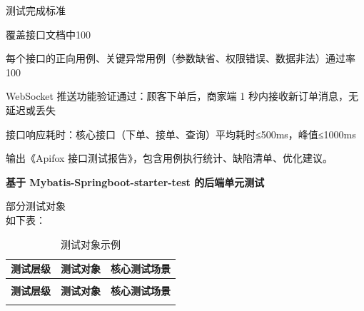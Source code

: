 \begin{levellist}
\begin{levellist}
\begin{levellist}
            \item 测试完成标准
            \begin{levellist}
                \item 覆盖接口文档中100%
                \item 每个接口的正向用例、关键异常用例（参数缺省、权限错误、数据非法）通过率100%
                \item WebSocket 推送功能验证通过：顾客下单后，商家端 1 秒内接收新订单消息，无延迟或丢失
                \item 接口响应耗时：核心接口（下单、接单、查询）平均耗时≤500ms，峰值≤1000ms
                \item 输出《Apifox 接口测试报告》，包含用例执行统计、缺陷清单、优化建议。
            \end{levellist}

        \end{levellist}

        \item \textbf{基于 Mybatis-Springboot-starter-test 的后端单元测试}
        \begin{levellist}
            \item 部分测试对象 \\
            如下表：

            \begin{longtable}{>{\centering\arraybackslash}m{2cm} >{\centering\arraybackslash}m{3cm} >{\centering\arraybackslash}m{9cm}}

                \caption{测试对象示例} \label{tab:training}                                                      \\

                \toprule
                \textbf{测试层级} & \textbf{测试对象}                                            & \textbf{核心测试场景} \\
                \midrule
                \endfirsthead

                \multicolumn{3}{c}{{\tablename\ \thetable{} 续表}}                                           \\
                \toprule
                \textbf{测试层级} & \textbf{测试对象}                                            & \textbf{核心测试场景} \\
                \midrule
                \endhead

                \bottomrule
                \endfoot



\end{longtable}
\end{levellist}
\end{levellist}
\end{levellist}
